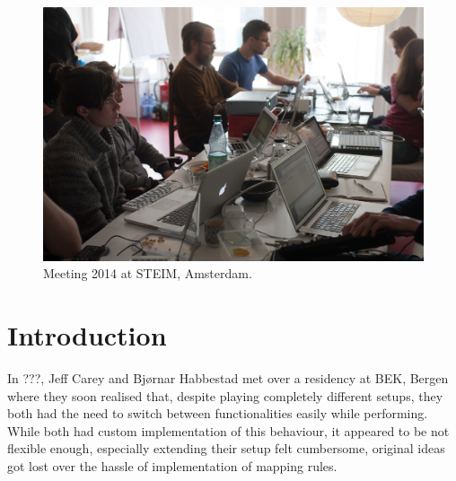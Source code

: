 \documentclass{article}
\title{\papertitle}
\begin{document}
%
\capstartfalse
\maketitle
\capstarttrue
%
\begin{abstract}
The Modality Toolkit aims to improve and facilitate the use of digital technology within interactive sound art and music. 
Written in SuperCollider, it simplifies the creation of individual electronic instruments by combining custom sound engines with off-the-shelf controllers. 
To this end, a common code interface, |MKtl|, is used to connect controllers from various sources and protocols. 
Currently, HID and MIDI are supported; GUI-based interfaces can be created on the fly from interface descriptions.

This paper gives an overview on the interpretation of modality as seen by a group of sound artists and researchers.
Furthermore, it describes the interdisciplinary approach on giving birth to a toolkit written for and by electronic musicians.
\end{abstract}

\begin{figure}[h]
	\centering
		\includegraphics[width=.9\columnwidth]{../media/20140331-IMG_5976.jpg}
	\caption{Meeting 2014 at STEIM, Amsterdam.}
	\label{fig:media_20140331-IMG_5976}
\end{figure}

\section{Introduction}
\label{sec:introduction}

In ???, Jeff Carey and Bj\o{}rnar Habbestad met over a residency at BEK, Bergen where they soon realised that, despite playing completely different setups, they both had the need to switch between functionalities easily while performing. 
While both had custom implementation of this behaviour, it appeared to be not flexible enough, especially extending their setup felt cumbersome, original ideas got lost over the hassle of implementation of mapping rules.
\end{document}
